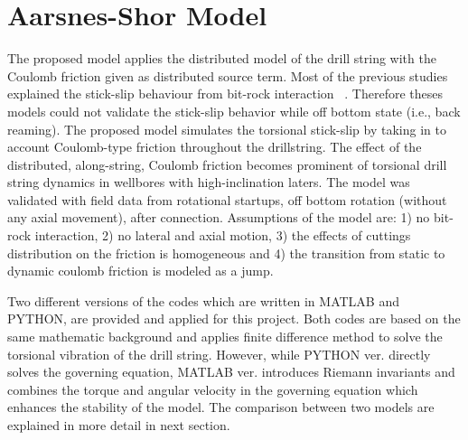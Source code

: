 \chapter{Aarsnes-Shor Model}
\label{ch:aarnessshormodel}

The proposed model applies the distributed model of the drill string with the Coulomb friction given as distributed source term. Most of the previous studies explained the stick-slip behaviour from bit-rock interaction ~\cite{ref:germay2009a, ref:richard2007a, ref:zhang2020a}. Therefore theses models could not validate the stick-slip behavior while off bottom state (i.e., back reaming). The proposed model simulates the torsional stick-slip by taking in to account Coulomb-type friction throughout the drillstring. The effect of the distributed, along-string, Coulomb friction becomes prominent of torsional drill string dynamics in wellbores with high-inclination laters. The model was validated with field data from rotational startups, off bottom rotation (without any axial movement), after connection. Assumptions of the model are: 1) no bit-rock interaction, 2) no lateral and axial motion, 3) the effects of cuttings distribution on the friction is homogeneous and 4) the transition from static to dynamic coulomb friction is modeled as a jump.

Two different versions of the codes which are written in MATLAB and PYTHON, are provided and applied for this project. Both codes are based on the same mathematic background and applies finite difference method to solve the torsional vibration of the drill string. However, while PYTHON ver. directly solves the governing equation, MATLAB ver. introduces Riemann invariants and combines the torque and angular velocity in the governing equation which enhances the stability of the model. The comparison between two models are explained in more detail in next section. 

